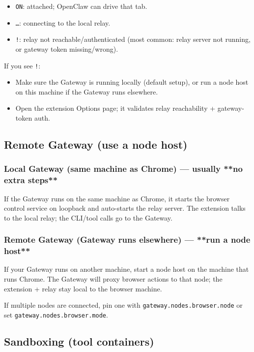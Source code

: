 \begin{itemize}
  \item \texttt{ON}: attached; OpenClaw can drive that tab.
  \item \texttt{…}: connecting to the local relay.
  \item \texttt{!}: relay not reachable/authenticated (most common: relay server not running, or gateway token missing/wrong).
\end{itemize}


If you see \texttt{!}:

\begin{itemize}
  \item Make sure the Gateway is running locally (default setup), or run a node host on this machine if the Gateway runs elsewhere.
  \item Open the extension Options page; it validates relay reachability + gateway-token auth.
\end{itemize}


\subsection{Remote Gateway (use a node host)}


\subsubsection{Local Gateway (same machine as Chrome) — usually **no extra steps**}


If the Gateway runs on the same machine as Chrome, it starts the browser control service on loopback
and auto-starts the relay server. The extension talks to the local relay; the CLI/tool calls go to the Gateway.

\subsubsection{Remote Gateway (Gateway runs elsewhere) — **run a node host**}


If your Gateway runs on another machine, start a node host on the machine that runs Chrome.
The Gateway will proxy browser actions to that node; the extension + relay stay local to the browser machine.

If multiple nodes are connected, pin one with \texttt{gateway.nodes.browser.node} or set \texttt{gateway.nodes.browser.mode}.

\subsection{Sandboxing (tool containers)}


